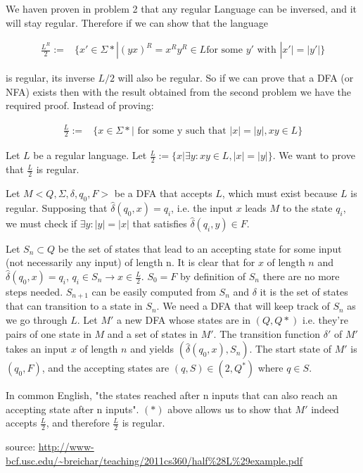 
We haven proven in problem 2 that any regular Language can be inversed, and it will stay regular. Therefore if we can show that the language

\begin{align*}
\frac {L^R}{2}:=& \{x' \in \Sigma * | (yx)^R = x^R y^R \in L \text{for some } y' \text{ with } |x'| = |y'| \}
\end{align*}

is regular, its inverse $L/2$ will also be regular. So if we can prove that a DFA (or NFA) exists then with the result obtained from the second problem we have the required proof.
Instead of proving:

\begin{align*}
\frac {L}{2} :=& \{x \in \Sigma * | \text{ for some y such that }|x| = |y|, xy \in L \}
\end{align*}
 
Let $L$ be a regular language. Let $\frac L 2 := \{ x | \exists y : xy \in L, |x| = |y| \}$. We want to prove that $\frac L 2$ is regular.

Let $M < Q, \Sigma, \delta, q_0, F>$ be a DFA that accepts $L$, which must exist because $L$ is regular. Supposing that $\hat \delta (q_0, x) = q_i$, i.e. the input $x$ leads $M$ to the state $q_i$, we must check if $\exists y : |y| = |x|$ that satisfies $\hat \delta (q_i, y) \in F$. 

Let $S_n \subset Q$ be the set of states that lead to an accepting state for some input (not necessarily any input) of length n. 
It is clear that for $x$ of length $n$ and $\hat \delta(q_0, x) = q_i$, $q_i \in S_n \rightarrow x \in \frac L 2$. 
$S_0 = F$ by definition of $S_n$ there are no more steps needed. $S_{n+1}$ can be easily computed from $S_n$ and $\delta$ it is the set of states that can transition to a state in $S_n$.
We need a DFA that will keep track of $S_n$ as we go through $L$. Let $M'$ a new DFA whose states are in $(Q, Q*)$ i.e. they're pairs of one state in $M$ and a set of states in $M'$. The transition function $\delta'$ of $M'$ takes an input $x$ of length $n$ and yields $(\hat \delta(q_0, x), S_n)$.
The start state of $M'$ is $(q_0, F)$, and the accepting states are $(q, S) \in (2, Q^*)$ where $q \in S$.

In common English, "the states reached after n inputs that can also reach an accepting state after n inputs". $(*)$ above allows us to show that $M'$ indeed accepts $\frac L 2$, and therefore $\frac L 2$ is regular.

source: \url{http://www-bcf.usc.edu/~breichar/teaching/2011cs360/half\%28L\%29example.pdf}
